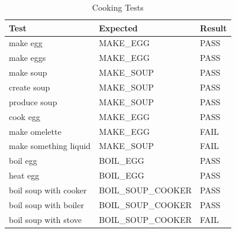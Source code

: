\documentclass[11pt]{article}
\begin{document}
\begin{table}[H]
\scriptsize
\centering
\caption{Cooking Tests}
\label{table:cooking-scores}
\begin{tabular}{lll}
\multicolumn{1}{l|}{Test}                           & \multicolumn{1}{l|}{Expected}           & Result                       \\ \hline
\multicolumn{1}{l|}{make egg}                       & \multicolumn{1}{l|}{MAKE\_EGG}          & \cellcolor[HTML]{67FD9A}PASS \\ \hline
\multicolumn{1}{l|}{make eggs}                      & \multicolumn{1}{l|}{MAKE\_EGG}          & \cellcolor[HTML]{67FD9A}PASS \\ \hline
\multicolumn{1}{l|}{make soup}                      & \multicolumn{1}{l|}{MAKE\_SOUP}         & \cellcolor[HTML]{67FD9A}PASS \\ \hline
\multicolumn{1}{l|}{create soup}                    & \multicolumn{1}{l|}{MAKE\_SOUP}         & \cellcolor[HTML]{67FD9A}PASS \\ \hline
\multicolumn{1}{l|}{produce soup}                   & \multicolumn{1}{l|}{MAKE\_SOUP}         & \cellcolor[HTML]{67FD9A}PASS \\ \hline
\multicolumn{1}{l|}{cook egg}                       & \multicolumn{1}{l|}{MAKE\_EGG}          & \cellcolor[HTML]{67FD9A}PASS \\ \hline
\multicolumn{1}{l|}{make omelette}                  & \multicolumn{1}{l|}{MAKE\_EGG}          & \cellcolor[HTML]{FD6864}FAIL \\ \hline
\multicolumn{1}{l|}{make something liquid}          & \multicolumn{1}{l|}{MAKE\_SOUP}         & \cellcolor[HTML]{FD6864}FAIL \\ \hline
\multicolumn{1}{l|}{boil egg}                       & \multicolumn{1}{l|}{BOIL\_EGG}          & \cellcolor[HTML]{67FD9A}PASS \\ \hline
\multicolumn{1}{l|}{heat egg}                       & \multicolumn{1}{l|}{BOIL\_EGG}          & \cellcolor[HTML]{67FD9A}PASS \\ \hline
\multicolumn{1}{l|}{boil soup with cooker}          & \multicolumn{1}{l|}{BOIL\_SOUP\_COOKER} & \cellcolor[HTML]{67FD9A}PASS \\ \hline
\multicolumn{1}{l|}{boil soup with boiler}          & \multicolumn{1}{l|}{BOIL\_SOUP\_COOKER} & \cellcolor[HTML]{67FD9A}PASS \\ \hline
\multicolumn{1}{l|}{boil soup with stove}           & \multicolumn{1}{l|}{BOIL\_SOUP\_COOKER} & \cellcolor[HTML]{FD6864}FAIL \\ \hline

\end{tabular}
\end{table}
\end{document}
